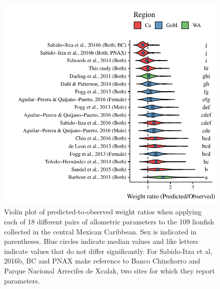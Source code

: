 \documentclass[fleqn,10pt,lineno]{wlpeerj} %
\begin{document}
\begin{figure}
\centering
\includegraphics{Manuscript_files/figure-latex/pred_obs-1.pdf}
\caption{\label{fig:bio_ratio}Violin plot of predicted-to-observed
weight ratios when applying each of 18 different pairs of allometric
parameters to the 109 lionfish collected in the central Mexican
Caribbean. Sex is indicated in parentheses. Blue circles indicate median
values and like letters indicate values that do not differ
significantly. For Sabido-Itza et al, 2016b, BC and PNAX make reference
to Banco Chinchorro and Parque Nacional Arrecifes de Xcalak, two sites
for which they report parameters.}
\end{figure}
\end{document}
